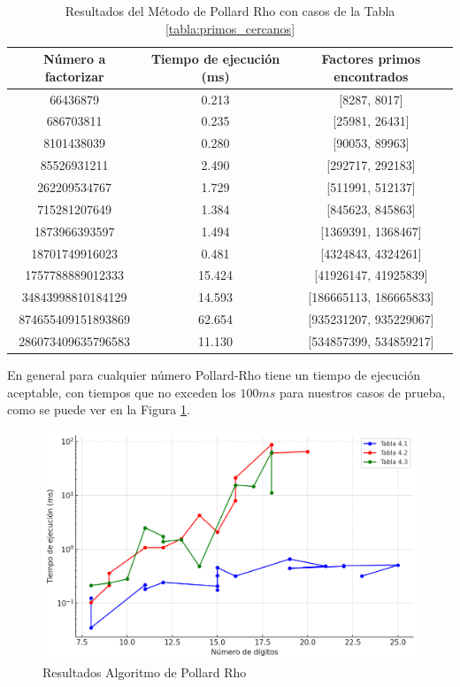     \begin{table}[H]
        \centering
        \begin{tabular}{ccc}
        \toprule
        Número a factorizar & Tiempo de ejecución (ms) & Factores primos encontrados\\
        \midrule
        66436879 & 0.213 & [8287, 8017]\\
        686703811 & 0.235 & [25981, 26431]\\
        8101438039 & 0.280 & [90053, 89963]\\
        85526931211 & 2.490 & [292717, 292183]\\
        262209534767 & 1.729 & [511991, 512137]\\
        715281207649 & 1.384 & [845623, 845863]\\
        1873966393597 & 1.494 & [1369391, 1368467]\\
        18701749916023 & 0.481 & [4324843, 4324261]\\
        1757788889012333 & 15.424 & [41926147, 41925839]\\
        34843998810184129 & 14.593 & [186665113, 186665833]\\
        874655409151893869 & 62.654 & [935231207, 935229067]\\
        286073409635796583 & 11.130 & [534857399, 534859217]\\
        \bottomrule
        \end{tabular}
        \caption{Resultados del Método de Pollard Rho con casos de la Tabla \ref{tabla:primos_cercanos}}
        \label{tab:res-pollard-rho-cercanos}
    \end{table}

    En general para cualquier número Pollard-Rho tiene un tiempo de ejecución aceptable, con tiempos que no exceden los $100ms$ para nuestros casos de prueba, como se puede ver en la Figura \ref{fig:res-pollard-rho}.

    \begin{figure}[H]
        \centering
        \includegraphics[width=\linewidth]{images/res-pollard-rho.png}
        \caption{Resultados Algoritmo de Pollard Rho}
        \label{fig:res-pollard-rho}
    \end{figure}


